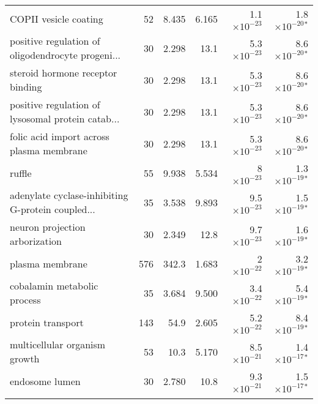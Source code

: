 \begin{longtable}{|l|r|r|r|r|r|}
                             COPII vesicle coating &                      52 &                   8.435 &      6.165 & 1.1$\times 10^{-23}$ &  1.8$\times 10^{-20}$$\bm{^*}$ \\
 positive regulation of oligodendrocyte progeni... &                      30 &                   2.298 &       13.1 & 5.3$\times 10^{-23}$ &  8.6$\times 10^{-20}$$\bm{^*}$ \\
                  steroid hormone receptor binding &                      30 &                   2.298 &       13.1 & 5.3$\times 10^{-23}$ &  8.6$\times 10^{-20}$$\bm{^*}$ \\
 positive regulation of lysosomal protein catab... &                      30 &                   2.298 &       13.1 & 5.3$\times 10^{-23}$ &  8.6$\times 10^{-20}$$\bm{^*}$ \\
          folic acid import across plasma membrane &                      30 &                   2.298 &       13.1 & 5.3$\times 10^{-23}$ &  8.6$\times 10^{-20}$$\bm{^*}$ \\
                                            ruffle &                      55 &                   9.938 &      5.534 &   8$\times 10^{-23}$ &  1.3$\times 10^{-19}$$\bm{^*}$ \\
 adenylate cyclase-inhibiting G-protein coupled... &                      35 &                   3.538 &      9.893 & 9.5$\times 10^{-23}$ &  1.5$\times 10^{-19}$$\bm{^*}$ \\
                    neuron projection arborization &                      30 &                   2.349 &       12.8 & 9.7$\times 10^{-23}$ &  1.6$\times 10^{-19}$$\bm{^*}$ \\
                                   plasma membrane &                     576 &                   342.3 &      1.683 &   2$\times 10^{-22}$ &  3.2$\times 10^{-19}$$\bm{^*}$ \\
                       cobalamin metabolic process &                      35 &                   3.684 &      9.500 & 3.4$\times 10^{-22}$ &  5.4$\times 10^{-19}$$\bm{^*}$ \\
                                 protein transport &                     143 &                    54.9 &      2.605 & 5.2$\times 10^{-22}$ &  8.4$\times 10^{-19}$$\bm{^*}$ \\
                     multicellular organism growth &                      53 &                    10.3 &      5.170 & 8.5$\times 10^{-21}$ &  1.4$\times 10^{-17}$$\bm{^*}$ \\
                                    endosome lumen &                      30 &                   2.780 &       10.8 & 9.3$\times 10^{-21}$ &  1.5$\times 10^{-17}$$\bm{^*}$ \\
$$
\end{longtable}
